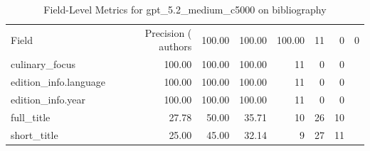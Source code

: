 \begin{table}
\caption{Field-Level Metrics for gpt_5.2_medium_c5000 on bibliography}
\label{tab:fields_gpt_5.2_medium_c5000_bibliography}
\begin{tabular}{lrrrrrr}
\toprule
Field & Precision (%
\midrule
authors & 100.00 & 100.00 & 100.00 & 11 & 0 & 0 \\
culinary_focus & 100.00 & 100.00 & 100.00 & 11 & 0 & 0 \\
edition_info.language & 100.00 & 100.00 & 100.00 & 11 & 0 & 0 \\
edition_info.year & 100.00 & 100.00 & 100.00 & 11 & 0 & 0 \\
full_title & 27.78 & 50.00 & 35.71 & 10 & 26 & 10 \\
short_title & 25.00 & 45.00 & 32.14 & 9 & 27 & 11 \\
\bottomrule
\end{tabular}
\end{table}
